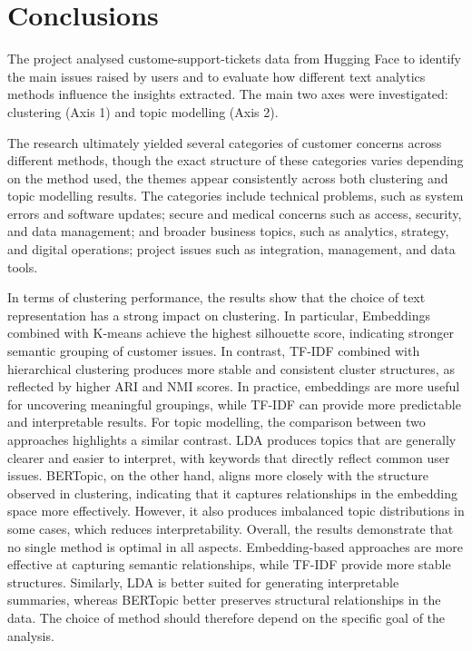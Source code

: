 \section{Conclusions}

The project analysed custome-support-tickets data from Hugging Face to identify the main issues raised by users and to evaluate how different text analytics methods influence the insights extracted. The main two axes were investigated: clustering (Axis 1) and topic modelling (Axis 2).

The research ultimately yielded several categories of customer concerns across different methods, though the exact structure of these categories varies depending on the method used, the themes appear consistently across both clustering and topic modelling results. The categories include technical problems, such as system errors and software updates; secure and medical concerns such as access, security, and data management; and broader business topics, such as analytics, strategy, and digital operations; project issues such as integration, management, and data tools. 

In terms of clustering performance, the results show that the choice of text representation has a strong impact on clustering. In particular, Embeddings combined with K-means achieve the highest silhouette score, indicating stronger semantic grouping of customer issues. In contrast, TF-IDF combined with hierarchical clustering produces more stable and consistent cluster structures, as reflected by higher ARI and NMI scores. In practice, embeddings are more useful for uncovering meaningful groupings, while TF-IDF can provide more predictable and interpretable results. For topic modelling, the comparison between two approaches highlights a similar contrast. LDA produces topics that are generally clearer and easier to interpret, with keywords that directly reflect common user issues. BERTopic, on the other hand, aligns more closely with the structure observed in clustering, indicating that it captures relationships in the embedding space more effectively. However, it also produces imbalanced topic distributions in some cases, which reduces interpretability. Overall, the results demonstrate that no single method is optimal in all aspects. Embedding-based approaches are more effective at capturing semantic relationships, while TF-IDF provide more stable structures. Similarly, LDA is better suited for generating interpretable summaries, whereas BERTopic better preserves structural relationships in the data. The choice of method should therefore depend on the specific goal of the analysis.

